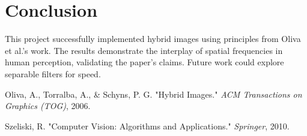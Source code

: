 \documentclass[12pt]{report}
\begin{document}
\chapter{Conclusion}
This project successfully implemented hybrid images using principles from Oliva et al.’s \cite{oliva2006} work. The results demonstrate the interplay of spatial frequencies in human perception, validating the paper’s claims. Future work could explore separable filters for speed.

\renewcommand{\bibname}{References}
\begin{thebibliography}{9}
  Oliva, A., Torralba, A., \& Schyns, P. G. "Hybrid Images." \textit{ACM Transactions on Graphics (TOG)}, 2006.

  Szeliski, R. "Computer Vision: Algorithms and Applications." \textit{Springer}, 2010.

\end{thebibliography}
\end{document}
